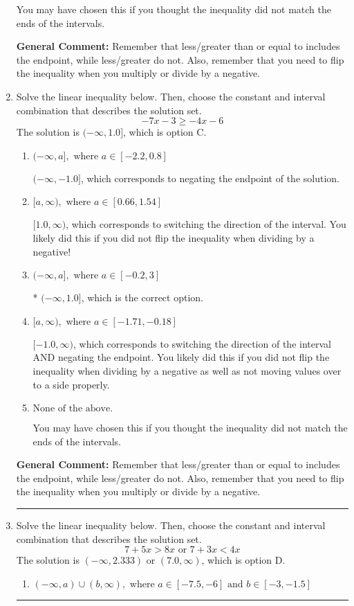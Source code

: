 \documentclass{extbook}[14pt]
\newcommand{\litem}[1]{\item #1

\rule{\textwidth}{0.4pt}}
\begin{document}
\begin{enumerate}
{\begin{enumerate}[label=\Alph*.]
You may have chosen this if you thought the inequality did not match the ends of the intervals.
\end{enumerate}

\textbf{General Comment:} Remember that less/greater than or equal to includes the endpoint, while less/greater do not. Also, remember that you need to flip the inequality when you multiply or divide by a negative.
}
\litem{
Solve the linear inequality below. Then, choose the constant and interval combination that describes the solution set.
\[ -7x -3 \geq -4x -6 \]The solution is \( (-\infty, 1.0] \), which is option C.\begin{enumerate}[label=\Alph*.]
\item \( (-\infty, a], \text{ where } a \in [-2.2, 0.8] \)

 $(-\infty, -1.0]$, which corresponds to negating the endpoint of the solution.
\item \( [a, \infty), \text{ where } a \in [0.66, 1.54] \)

 $[1.0, \infty)$, which corresponds to switching the direction of the interval. You likely did this if you did not flip the inequality when dividing by a negative!
\item \( (-\infty, a], \text{ where } a \in [-0.2, 3] \)

* $(-\infty, 1.0]$, which is the correct option.
\item \( [a, \infty), \text{ where } a \in [-1.71, -0.18] \)

 $[-1.0, \infty)$, which corresponds to switching the direction of the interval AND negating the endpoint. You likely did this if you did not flip the inequality when dividing by a negative as well as not moving values over to a side properly.
\item \( \text{None of the above}. \)

You may have chosen this if you thought the inequality did not match the ends of the intervals.
\end{enumerate}

\textbf{General Comment:} Remember that less/greater than or equal to includes the endpoint, while less/greater do not. Also, remember that you need to flip the inequality when you multiply or divide by a negative.
}
\litem{
Solve the linear inequality below. Then, choose the constant and interval combination that describes the solution set.
\[ 7 + 5 x > 8 x \text{ or } 7 + 3 x < 4 x \]The solution is \( (-\infty, 2.333) \text{ or } (7.0, \infty) \), which is option D.\begin{enumerate}[label=\Alph*.]
\item \( (-\infty, a) \cup (b, \infty), \text{ where } a \in [-7.5, -6] \text{ and } b \in [-3, -1.5] \)


\end{enumerate}}
\end{enumerate}
\end{document}
